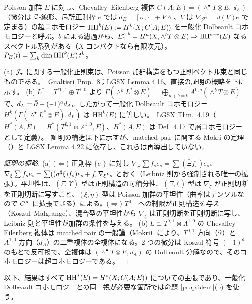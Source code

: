 \begin{defn}\label{defn:HH}
Poisson 加群 $E$ に対し、Chevalley--Eilenberg 複体 $C(A;E)=(\wedge^\bullet T\otimes E,\ d_E)$（微分は $\mathbb C$-線形、局所正則枠 $e$ では $d_E=[\sigma,\cdot]+V\wedge$、$V$ は $\nabla_\beta e=\beta(V)e$ で定まる）の超コホモロジー $\mathrm{HH}^k(E):=H^k(X;C(A;E))$ を一般化 Dolbeault コホモロジーと呼ぶ。$b$ による濾過から、$E_1^{a,b}=H^a(X,\wedge^bT\otimes E)\Rightarrow\mathrm{HH}^{a+b}(E)$ なるスペクトル系列がある（$X$ コンパクトなら有限次元）。$P_E(t)=\sum_k\dim\mathrm{HH}^k(E)\,t^k$。
\end{defn}

\begin{prop}[一般化正則束 $=$ Poisson 加群、Dolbeault モデル]\label{prop:ident}
(a) $\mathcal J_\sigma$ に関する一般化正則束は、Poisson 加群構造をもつ正則ベクトル束と同じものである。\tC\ Gualtieri \cite{GuaBr} Prop.~8；LGSX Lemma 4.16。直接の証明の概略を下に示す\tP。
(b) $L^*=T^{*0,1}\oplus T^{1,0}$ より $\Gamma(\wedge^kL^*\otimes E)=\bigoplus_{a+b=k}A^{0,a}(\wedge^bT\otimes E)$ で、$d_L=\bar\partial+(-1)^ad_A$。したがって一般化 Dolbeault コホモロジー $H^k(\Gamma(\wedge^\bullet L^*\otimes E),d_L)$ は $\mathrm{HH}^k(E)$ に等しい。\tC\ LGSX Thm.~4.19（$H^*(A,E)=H^*(T^{0,1}\bowtie A^{1,0},E)$、$H^*(A,E)$ は Def.~4.17 で層コホモロジーとして定義）。\tP\ 証明の構造は下に示すが、matched pair に関する Mokri の定理（\cite{Mok}）と LGSX Lemma 4.22 に依存し、これらは再導出していない\tQ。
\end{prop}
\begin{proof}[証明の概略]
(a) ($\Leftarrow$) 正則枠 $\{e_s\}$ に対し $\nabla_{\bar\Xi}\sum f_se_s=\sum(\bar\Xi f_s)e_s$、$\nabla_\xi\sum f_se_s=\sum((\sigma^\sharp\xi)f_s)e_s+f_s\nabla_\xi e_s$ とおく（Leibniz 則から強制される唯一の拡張）。平坦性は、$(\bar\Xi,\bar\Upsilon)$ 型は正則構造の可積分性、$(\bar\Xi,\xi)$ 型は $\nabla_\xi$ が正則切断を正則切断に写すこと、$(\xi,\eta)$ 型は Poisson 加群の平坦性（曲率はテンソルなので $C^\infty$ に拡張できる）による。($\Rightarrow$) $T^{0,1}$ への制限が正則構造を与え（Koszul--Malgrange）、混合型の平坦性から $\nabla_\xi$ は正則切断を正則切断に写し、Leibniz 則と平坦性が加群の条件を与える。
(b) $L\cong T^{0,1}\bowtie A^{1,0}$ の Chevalley--Eilenberg 複体は matched pair の一般論（Mokri）により、$T^{0,1}$ 方向（$\bar\partial$）と $A^{1,0}$ 方向（$d_A$）の二重複体の全複体になる。2 つの微分は Koszul 符号 $(-1)^a$ のもとで反可換で、全複体は $(\wedge^\bullet T\otimes E,d_A)$ の Dolbeault 分解なので、そのコホモロジーは超コホモロジーである。\qedhere
\end{proof}
以下、結果はすべて $\mathrm{HH}^*(E)=H^*(X;C(A;E))$ についての主張であり、一般化 Dolbeault コホモロジーとの同一視が必要な箇所では命題 \ref{prop:ident}(b) を使う。


